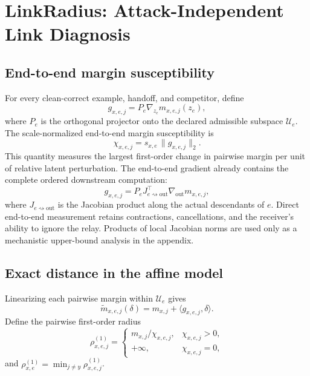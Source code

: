 \documentclass[11pt]{article}
\begin{document}
\section{LinkRadius: Attack-Independent Link Diagnosis}
\label{sec:method}

\subsection{End-to-end margin susceptibility}

For every clean-correct example, handoff, and competitor, define
\begin{equation}
    g_{x,e,j}
    =P_e\nabla_{z_e}m_{x,e,j}(z_e),
\end{equation}
where \(P_e\) is the orthogonal projector onto the declared admissible
subspace \(\mathcal U_e\). The scale-normalized end-to-end margin
susceptibility is
\begin{equation}
    \chi_{x,e,j}
    =
    s_{x,e}\,\|g_{x,e,j}\|_2.
    \label{eq:susceptibility}
\end{equation}
This quantity measures the largest first-order change in pairwise margin per
unit of relative latent perturbation. The end-to-end gradient already contains
the complete ordered downstream computation:
\begin{equation}
    g_{x,e,j}
    =
    P_eJ_{e\rightsquigarrow\mathrm{out}}^\top
    \nabla_{\mathrm{out}}m_{x,e,j},
    \label{eq:unrolled-jacobian}
\end{equation}
where $J_{e\rightsquigarrow\mathrm{out}}$ is the Jacobian product along the
actual descendants of $e$. Direct end-to-end measurement retains contractions,
cancellations, and the receiver's ability to ignore the relay. Products of
local Jacobian norms are used only as a mechanistic upper-bound analysis in the
appendix.

\subsection{Exact distance in the affine model}

Linearizing each pairwise margin within \(\mathcal U_e\) gives
\begin{equation}
    \widetilde m_{x,e,j}(\delta)
    =m_{x,j}+\langle g_{x,e,j},\delta\rangle.
    \label{eq:affine-margin}
\end{equation}
Define the pairwise first-order radius
\begin{equation}
    \rho^{(1)}_{x,e,j}
    =
    \begin{cases}
    m_{x,j}/\chi_{x,e,j}, & \chi_{x,e,j}>0,\\
    +\infty, & \chi_{x,e,j}=0,
    \end{cases}
\end{equation}
and \(\rho^{(1)}_{x,e}=\min_{j\ne y}\rho^{(1)}_{x,e,j}\).
\end{document}
